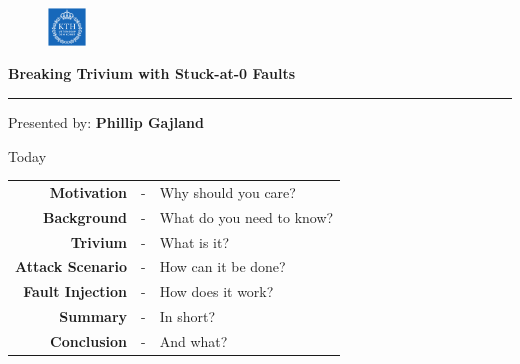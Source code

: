 \documentclass[10pt, compress]{beamer}
\begin{document}
    \begin{frame}[plain,t]
        \begin{figure}
            \begin{flushright}
                \vspace{-2cm}
                \includegraphics[width = 10mm]{figures/kth_logo.png}
            \end{flushright}
        \end{figure}

        \vspace{2cm}

        {\large\textbf{Breaking Trivium with Stuck-at-0 Faults}}
        \\\rule{7.5cm}{1pt}

        \vspace{0.5cm}

        {\large Presented by: \textbf{Phillip Gajland}}

        \begin{figure}
            
        \end{figure}
    \end{frame}

    \begin{frame}{Today}
        \begin{table}
            \def\arraystretch{1.2}
            \raggedright
            \begin{tabular}{r c l}
                \textbf{Motivation} &-& Why should you care?\\
                \textbf{Background} &-& What do you need to know?\\
                \textbf{Trivium} &-& What is it?\\
                \textbf{Attack Scenario} &-& How can it be done?\\
                \textbf{Fault Injection} &-& How does it work?\\
                \textbf{Summary} &-& In short?\\
                \textbf{Conclusion} &-& And what?
            \end{tabular}
        \end{table}
    \end{frame}
\end{document}
